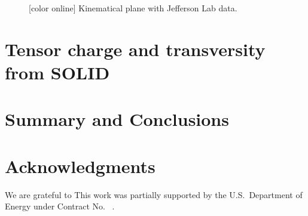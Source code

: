 \documentclass[twocolumn,showpacs,preprintnumbers,amsmath,amssymb,floatfix,prd]{revtex4}
\newcommand*{\BibPath}{.}%
\begin{document}
%
%


%
\begin{figure}[thb!]
\vspace*{-0.4cm}
\begin{center}
\vspace*{-0.6cm}
 \end{center}
\vspace*{-0.7cm}
\caption{\label{fig:kimen} [color online]
Kinematical plane with Jefferson Lab data.}
\end{figure}
%
 

 
\section{Tensor charge and transversity from SOLID}

\section{Summary and Conclusions}
%
 

\section*{Acknowledgments}
%
We are grateful to  
This work was partially supported by   the
U.S.\ Department of Energy under Contract No.~ .


 
\end{document}
